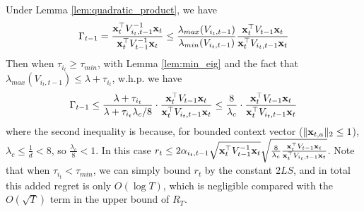 \noindent Under Lemma \ref{lem:quadratic_product}, we have $$\Gamma_{t-1}=\frac{\mathbf{x}_{t}^{\top}{V}_{i_{t},t-1}^{-1}\mathbf{x}_{t}}{\mathbf{x}_{t}^{\top}{V}_{t-1}^{-1}\mathbf{x}_{t}} \leq \frac{\lambda_{max}(V_{i_{t},t-1})}{\lambda_{min}(V_{i_{t},t-1})}\frac{\mathbf{x}_{t}^{\top}{V}_{t-1}\mathbf{x}_{t}}{\mathbf{x}_{t}^{\top}{V}_{i_{t},t-1}\mathbf{x}_{t}}$$
Then when $\tau_{i_{t}} \geq \tau_{min}$, with Lemma \ref{lem:min_eig} and the fact that $\lambda_{max}(V_{i_{t},t-1})\leq \lambda + \tau_{i_{t}}$, w.h.p. we have $$\Gamma_{t-1} \leq \frac{\lambda + \tau_{i_{t}}}{\lambda+{\tau_{i_{t}}\lambda_{c}}/{8}} \cdot \frac{\mathbf{x}_{t}^{\top}{V}_{t-1}\mathbf{x}_{t}}{\mathbf{x}_{t}^{\top}{V}_{i_{t},t-1}\mathbf{x}_{t}} \leq \frac{8}{\lambda_{c}}\cdot \frac{\mathbf{x}_{t}^{\top}{V}_{t-1}\mathbf{x}_{t}}{\mathbf{x}_{t}^{\top}{V}_{i_{t},t-1}\mathbf{x}_{t}}$$ where the second inequality is because, for bounded context vector ($\lVert \mathbf{x}_{t,a} \rVert_{2} \leq 1$), $\lambda_{c} \leq \frac{1}{d} < 8$, so $\frac{\lambda_{c}}{8}<1$. In this case $r_{t} \leq 
2 \alpha_{i_{t},t-1}\sqrt{\mathbf{x}_{t}^{\top}{V}_{t-1}^{-1}\mathbf{x}_{t}}\sqrt{ \frac{8}{\lambda_{c}} \frac{\mathbf{x}_{t}^{\top}{V}_{t-1}\mathbf{x}_{t}}{\mathbf{x}_{t}^{\top}{V}_{i_{t},t-1}\mathbf{x}_{t}}}$. Note that when $\tau_{i_{t}} < \tau_{min}$, we can simply bound $r_{t}$ by the constant $2 L S$, and in total this added regret is only $O(\log{T})$, which is negligible compared with the $O(\sqrt{T})$ term in the upper bound of $R_{T}$.

